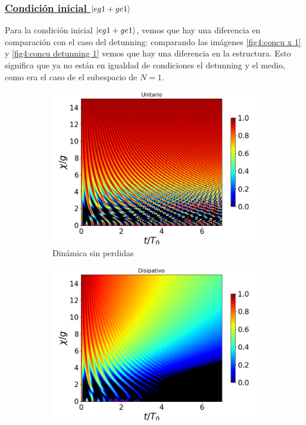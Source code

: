 \subsubsection{\underline{Condición inicial $\ket{eg1+ge1}$}}
Para la condición inicial $\ket{eg1+ge1}$, vemos que hay una diferencia en comparación con el caso del detunning: comparando las imágenes \ref{fig4:concu x 1} y \ref{fig4:concu detunning 1} vemos que hay una diferencia en la estructura. Esto significa que ya no están en igualdad de condiciones el detunning y el medio, como era el caso de el subespacio de $N=1$.
\begin{figure}[h!]
    \centering
    \begin{subfigure}{0.49\textwidth}
        \includegraphics[width=\textwidth]{figuras/ch4/concu/chi/eg1+ge1 d=0.0g k=0.0g J=0.0g gamma=0.25g concu chi uni.png}
        \caption{Dinámica sin perdidas}
        \label{fig4:concu x 1 uni}
    \end{subfigure}
    \hfill
    \begin{subfigure}{0.49\textwidth}
        \includegraphics[width=\textwidth]{figuras/ch4/concu/chi/eg1+ge1 d=0.0g k=0.0g J=0.0g gamma=0.25g concu chi dis.png}

\end{subfigure}
\end{figure}
